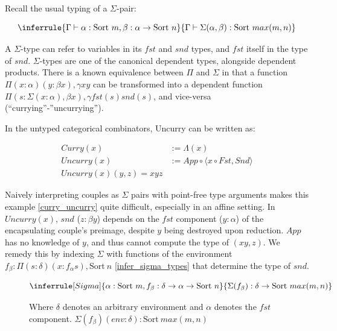 \documentclass{article}
\newcommand{\sort}[1]{\text{Sort}\ #1}
\begin{document}
Recall the usual typing of a \(\Sigma\)-pair:

\begin{equation}
\inferrule
{ \Gamma \vdash \alpha : \sort{m}, \beta : \alpha \rightarrow \sort{n}}
{ \Gamma \vdash \Sigma(\alpha, \beta) : \sort{max(m, n)}}
\end{equation}

A \(\Sigma\)-type can refer to variables in its \(fst\) and \(snd\) types, and \(fst\) itself in the type of \(snd\). \(\Sigma\)-types are one of the canonical dependent types, alongside dependent products. There is a known equivalence between \(\Pi\) and \(\Sigma\) in that a function \(\Pi(x : \alpha)(y : \beta x), \gamma x y\) can be transformed into a dependent function \(\Pi(s : \Sigma (x : \alpha), \beta x),\gamma fst(s) snd(s)\), and vice-versa (``currying''-''uncurrying'').

In the untyped categorical combinators, Uncurry can be written as:

\begin{equation}\label{curr_uncurr}
  \begin{split}
    \textit{Curry}(x) &:= \Lambda(x) \\
    \textit{Uncurry}(x) &:= App \circ \langle x \circ Fst, Snd \rangle\\
    \textit{Uncurry}(x) (y, z) = x y z
  \end{split}
\end{equation}

Naively interpreting couples as \(\Sigma\) pairs with point-free type arguments makes this example \eqref{curry_uncurry} quite difficult, especially in an affine setting. In \(\textit{Uncurry}(x)\), \(snd\) (\(z : \beta y\)) depends on the \(fst\) component (\(y : \alpha\)) of the encapsulating couple's preimage, despite \(y\) being destroyed upon reduction. \(App\) has no knowledge of \(y\), and thus cannot compute the type of \((x y, z)\). We remedy this by indexing \(\Sigma\) with functions of the environment \(f_\beta : \Pi(s : \delta)(x : f_\alpha s),\sort{n}\) \eqref{infer_sigma_types} that determine the type of \(snd\).

\begin{figure}[h!]
\begin{equation}\label{infer_sigma_types}
  \inferrule[Sigma]
  { \alpha : \sort{m}, f_\beta : \delta \rightarrow \alpha \rightarrow \sort{n}}
  { \Sigma(f_\beta) : \delta \rightarrow \sort{max(m, n)}}
\end{equation}
\caption{Where \(\delta\) denotes an arbitrary environment and \(\alpha\) denotes the \(fst\) component. \(\Sigma(f_\beta) (env : \delta) : \sort{max(m, n)}\)}
\end{figure}
\end{document}
